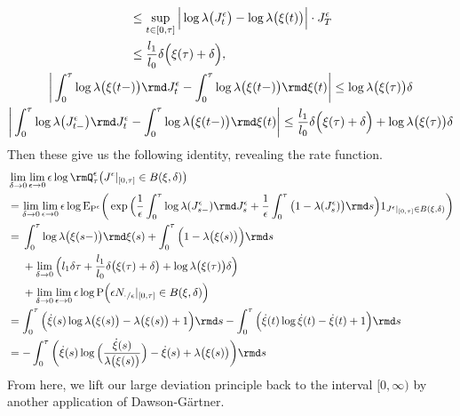 \begin{example}
\begin{gather*}
\begin{aligned}[t]
      &\leq \sup_{t\in[0,\tau]} \Big| \log\affInt\big(J^\epsilon_t\big) - \log\affInt\big(\pathVar(t)\big) \Big| \cdot J^\epsilon_T \\
      &\leq \frac{\affIntPart_1}{\affIntPart_0} \delta \Big( \pathVar(\tau) + \delta \Big), 
    \end{aligned} \\
    \bigg| \int_0^\tau \log\affInt\big(\pathVar(t-)\big) \rmd J^\epsilon_t - \int_0^\tau \log\affInt\big(\pathVar(t-)\big) \rmd \pathVar(t)  \bigg| 
    \leq \log\affInt\big(\pathVar(\tau)\big) \delta \\
    \bigg| \int_0^\tau \log\affInt\big(J^\epsilon_{t-}\big) \rmd J^\epsilon_t - \int_0^\tau \log\affInt\big(\pathVar(t-)\big) \rmd \pathVar(t) \bigg| 
    \leq \frac{\affIntPart_1}{\affIntPart_0} \delta \Big( \pathVar(\tau) + \delta \Big) + \log\affInt\big(\pathVar(\tau)\big) \delta 
  \end{gather*}
  Then these give us the following identity, revealing the rate function.
  \begin{align*}
    &\lim_{\delta\rightarrow0}\lim_{\epsilon\rightarrow0}\epsilon\log\mgPrb^\epsilon_\tau\big( J^\epsilon|_{[0,\tau]} \in \ball{\pathVar}{\delta} \big) \\
    &= \lim_{\delta\rightarrow0}\lim_{\epsilon\rightarrow0} \epsilon\log\Exp_{\Prb^\epsilon}\bigg( \exp\Big(\frac1\epsilon\int_0^\tau \log\affInt(J^\epsilon_{s-}) \rmd J^\epsilon_s + \frac1\epsilon\int_0^\tau \big(1 - \affInt(J^\epsilon_s) \big) \rmd s  \Big) 1_{J^\epsilon|_{[0,\tau]} \in \ball{\pathVar}{\delta}} \bigg) \\
    &= \begin{aligned}[t]
      & \int_0^\tau \log\affInt\big(\pathVar(s-)\big) \rmd\pathVar(s) + \int_0^\tau \Big(1 - \affInt\big(\pathVar(s)\big) \Big) \rmd s \\
      &+\lim_{\delta\rightarrow0} \Big( \affIntPart_1 \delta \tau + \frac{\affIntPart_1}{\affIntPart_0} \delta \big( \pathVar(\tau) + \delta \big) + \log\affInt\big(\pathVar(\tau)\big) \delta \Big) \\
      &+\lim_{\delta\rightarrow0}\lim_{\epsilon\rightarrow0} \epsilon \log \Prb\Big( \epsilon \N_{\cdot/\epsilon}|_{[0,\tau]} \in \ball{\pathVar}{\delta} \Big)
    \end{aligned} \\
    &= \int_0^\tau \Big( \dot\pathVar(s) \log \affInt\big(\pathVar(s)\big) - \affInt\big(\pathVar(s)\big) + 1 \Big) \rmd s - \int_0^\tau \Big(\dot\pathVar(t) \log \dot\pathVar(t) - \dot\pathVar(t) + 1 \Big) \rmd s \\
    &= -\int_0^\tau \bigg( \dot\pathVar(s) \log\Big(\frac{\dot\pathVar(s)}{\affInt\big(\pathVar(s)\big)} \Big) - \dot\pathVar(s) + \affInt\big(\pathVar(s)\big) \bigg) \rmd s
  \end{align*}
  From here, we lift our large deviation principle back to the interval $[0,\infty)$ by another application of Dawson-G\"artner.


\end{example}
